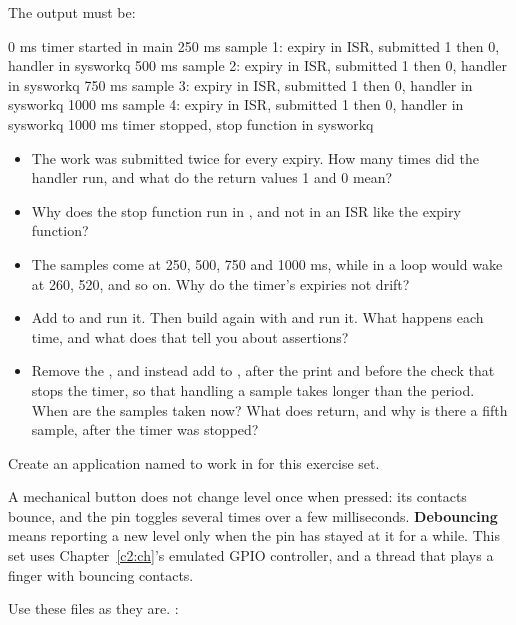 The output must be:

\begin{console}
   0 ms  timer started in main
 250 ms  sample 1: expiry in ISR, submitted 1 then 0, handler in sysworkq
 500 ms  sample 2: expiry in ISR, submitted 1 then 0, handler in sysworkq
 750 ms  sample 3: expiry in ISR, submitted 1 then 0, handler in sysworkq
1000 ms  sample 4: expiry in ISR, submitted 1 then 0, handler in sysworkq
1000 ms  timer stopped, stop function in sysworkq
\end{console}

\begin{itemize}
  \item The work was submitted twice for every expiry. How many times did the handler run, and what do the
    return values 1 and 0 mean?
  \item Why does the stop function run in , and not in an ISR like the expiry function?
  \item The samples come at 250, 500, 750 and 1000 ms, while  in a loop would wake at
    260, 520, and so on. Why do the timer’s expiries not drift?
  \item Add  to  and run it. Then build again with  and run it. What happens each time, and what does that tell you about assertions?
  \item Remove the , and instead add  to ,
    after the print and before the check that stops the timer, so that handling a sample takes longer
    than the period. When are the samples taken now? What does  return, and why is
    there a fifth sample, after the timer was stopped?
\end{itemize}

\label{c3:set:3}
Create an application named  to work in for this exercise set.

A mechanical button does not change level once when pressed: its contacts bounce, and the pin
toggles several times over a few milliseconds. \textbf{Debouncing} means reporting a new level only
when the pin has stayed at it for a while. This set uses Chapter~\ref{c2:ch}’s emulated GPIO
controller, and a thread that plays a finger with bouncing contacts.

Use these files as they are. :

